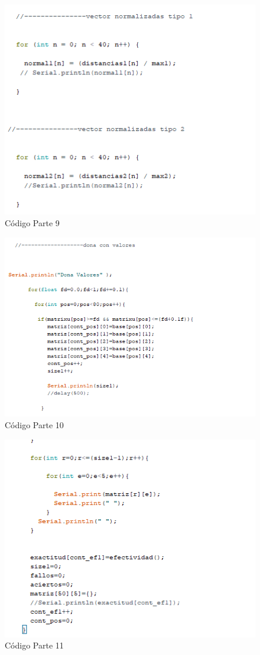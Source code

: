\documentclass[10pt,a4paper]{article}
\begin{document}
\begin{figure}[H]
\caption{Código Parte 9}
\centering
\includegraphics[scale=0.9]{c9.png}
\end{figure}

\begin{figure}[H]
\caption{Código Parte 10}
\centering
\includegraphics[scale=0.9]{c10.png}
\end{figure}

\begin{figure}[H]
\caption{Código Parte 11}
\centering
\includegraphics[scale=0.9]{c11.png}
\end{figure}
\end{document}
